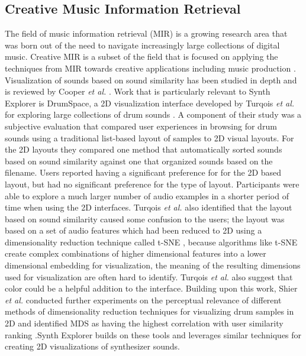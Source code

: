 \subsection{Creative Music Information Retrieval}
The field of music information retrieval (MIR) is a growing research area that was born out of the need to navigate increasingly large collections of digital music. Creative MIR is a subset of the field that is focused on applying the techniques from MIR towards creative applications including music production \cite{humphrey2013brief}. Visualization of sounds based on sound similarity has been studied in depth and is reviewed by Cooper \textit{et al.} \cite{cooper2006visualization}. Work that is particularly relevant to Synth Explorer is DrumSpace, a 2D visualization interface developed by Turqois \textit{et al.} for exploring large collections of drum sounds \cite{turquois2016exploring}. A component of their study was a subjective evaluation that compared user experiences in browsing for drum sounds using a traditional list-based layout of samples to 2D visual layouts. For the 2D layouts they compared one method that automatically sorted sounds based on sound similarity against one that organized sounds based on the filename. Users reported having a significant preference for for the 2D based layout, but had no significant preference for the type of layout. Participants were able to explore a much larger number of audio examples in a shorter period of time when using the 2D interfaces. Turqois \textit{et al.} also identified that the layout based on sound similarity caused some confusion to the users; the layout was based on a set of audio features which had been reduced to 2D using a dimensionality reduction technique called t-SNE \cite{van2008visualizing}, because algorithms like t-SNE create complex combinations of higher dimensional features into a lower dimensional embedding for visualization, the meaning of the resulting dimensions used for visualization are often hard to identify. Turqois \textit{ et al.} also suggest that color could be a helpful addition to the interface. Building upon this work, Shier \textit{et al.} conducted further experiments on the perceptual relevance of different methods of dimensionality reduction techniques for visualizing drum samples in 2D and identified MDS as having the highest correlation with user similarity ranking \cite{shier2021manifold}.Synth Explorer builds on these tools and leverages similar techniques for creating 2D visualizations of synthesizer sounds.

